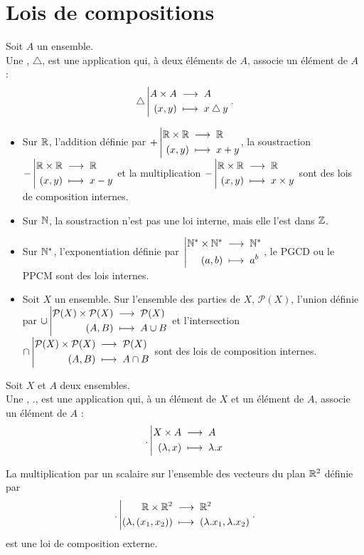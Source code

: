 \documentclass{book}
\begin{document}
\section{Lois de compositions}
\begin{Definition}
Soit $A$ un ensemble.\\
Une , $\bigtriangleup$, est une application qui, à deux éléments de $A$, associe un élément de $A$ :
$$ {\bigtriangleup}\left|\begin{aligned}{A\times A}&\;\longrightarrow\;{A}\\{(x,y)}&\;\longmapsto\;{x \bigtriangleup y}\end{aligned}\right..$$
\end{Definition}
\begin{Exemple}
\begin{itemize}
\item Sur $\mathbb{R}$, l'addition définie par ${+}\left|\begin{aligned}{\mathbb{R}\times \mathbb{R}}&\;\longrightarrow\;{\mathbb{R}}\\{(x,y)}&\;\longmapsto\;{x + y}\end{aligned}\right.$, la soustraction ${-}\left|\begin{aligned}{\mathbb{R}\times \mathbb{R}}&\;\longrightarrow\;{\mathbb{R}}\\{(x,y)}&\;\longmapsto\;{x - y}\end{aligned}\right.$ et la multiplication ${-}\left|\begin{aligned}{\mathbb{R}\times \mathbb{R}}&\;\longrightarrow\;{\mathbb{R}}\\{(x,y)}&\;\longmapsto\;{x \times y}\end{aligned}\right.$ sont des lois de composition internes.
\item Sur $\mathbb{N}$, la soustraction n'est pas une loi interne, mais elle l'est dans $\mathbb{Z}$.
\item Sur $\mathbb{N}^*$,  l'exponentiation définie par ${}\left|\begin{aligned}{\mathbb{N}^*\times\mathbb{N}^*}&\;\longrightarrow\;{\mathbb{N}^*}\\{(a,b)}&\;\longmapsto\;{a^b}\end{aligned}\right.$, le PGCD ou le PPCM sont des lois internes.
\item Soit $X$ un ensemble. Sur l'ensemble des parties de $X$, $\mathcal{P}(X)$, l'union définie par ${\cup}\left|\begin{aligned}{\mathcal{P}(X)\times \mathcal{P}(X)}&\;\longrightarrow\;{\mathcal{P}(X)}\\{(A,B)}&\;\longmapsto\;{A \cup B}\end{aligned}\right.$ et l'intersection ${\cap}\left|\begin{aligned}{\mathcal{P}(X)\times \mathcal{P}(X)}&\;\longrightarrow\;{\mathcal{P}(X)}\\{(A,B)}&\;\longmapsto\;{A \cap B}\end{aligned}\right.$ sont des lois de composition internes.
\end{itemize}
\end{Exemple}

\begin{Definition} 
Soit $X$ et $A$ deux ensembles.\\
Une , $.$, est une application qui, à un élément de $X$ et un élément de $A$, associe un élément de $A$ :
$$ {.}\left|\begin{aligned}{X\times A}&\;\longrightarrow\;{A}\\{(\lambda,x)}&\;\longmapsto\;{\lambda. x}\end{aligned}\right. $$
\end{Definition}
\begin{Exemple}[\((\R^2,.)\)]
La multiplication par un scalaire sur l'ensemble des vecteurs du plan  $\mathbb{R}^2$ définie par 
$$ {.}\left|\begin{aligned}{\mathbb{R}\times\mathbb{R}^2}&\;\longrightarrow\;{\mathbb{R}^2}\\{(\lambda,(x_1,x_2))}&\;\longmapsto\;{(\lambda.x_1, \lambda.x_2)}\end{aligned}\right..$$ est une loi de composition externe.
\end{Exemple}
\end{document}

